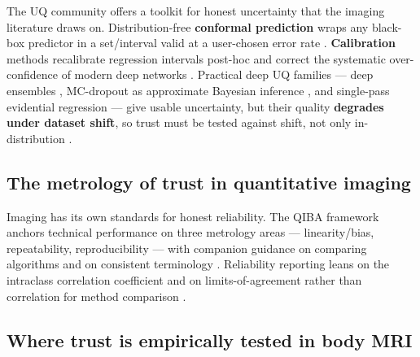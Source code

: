 \documentclass[review,number]{elsarticle}
\begin{document}
The UQ community offers a toolkit for honest uncertainty that the imaging literature
draws on. Distribution-free \textbf{conformal prediction} wraps any black-box predictor
in a set/interval valid at a user-chosen error rate \cite{shafer2008,angelopoulos2021}.
\textbf{Calibration} methods recalibrate regression intervals post-hoc
\cite{kuleshov2018} and correct the systematic over-confidence of modern deep networks
\cite{guo2017}. Practical deep UQ families --- deep ensembles
\cite{lakshminarayanan2017}, MC-dropout as approximate Bayesian inference
\cite{gal2016}, and single-pass evidential regression \cite{amini2020} --- give usable
uncertainty, but their quality \textbf{degrades under dataset shift}, so trust must be
tested against shift, not only in-distribution \cite{ovadia2019}.

\subsection{The metrology of trust in quantitative imaging}
\label{sec:trust-metrology}

Imaging has its own standards for honest reliability. The QIBA framework anchors
technical performance on three metrology areas --- linearity/bias, repeatability,
reproducibility \cite{raunig2015} --- with companion guidance on comparing algorithms
\cite{obuchowski2015} and on consistent terminology \cite{sullivan2015}. Reliability
reporting leans on the intraclass correlation coefficient
\cite{koo2016}%
{} and on limits-of-agreement rather than correlation for method comparison
\cite{blandaltman1986}.%

\subsection{Where trust is empirically tested in body MRI}
\label{sec:trust-bodymri}
\end{document}
